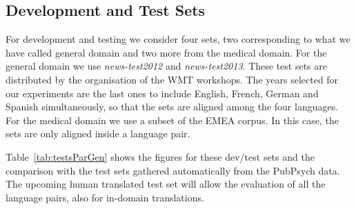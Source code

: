 \documentclass[a4paper,11pt]{article}
\begin{document}




%    


\subsection{Development and Test Sets}
\label{ss:genTests}

For development and testing we consider four sets, two corresponding to what we have called general domain and two more from the medical domain. For the general domain we use \emph{news-test2012} and \emph{news-test2013}. These test sets are distributed by the organisation of the WMT workshops. The years selected for our experiments are the last ones to include English, French, German and Spanish simultaneously, so that the sets are aligned among the four languages. For the medical domain we use a subset of the EMEA corpus. In this case, the sets are only aligned inside a language pair.

Table~\ref{tab:testsParGen} shows the figures for these dev/test sets and the comparison with the test sets gathered automatically from the PubPsych data. 
The upcoming human translated test set will allow the evaluation of all the language pairs, also for in-domain translations.
\end{document}

